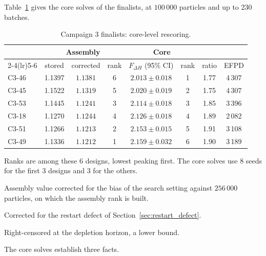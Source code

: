 \label{sec:res-corevalidation}

Table~\ref{tab:core-finalists} gives the core solves of the finalists,
at $100\,000$ particles and up to 230 batches.

\begin{table}[htbp]
  \centering
  \begin{threeparttable}
  \caption{Campaign 3 finalists: core-level rescoring.}
  \label{tab:core-finalists}
  \small
  \setlength{\tabcolsep}{4pt}
  \begin{tabular}{lccccccc}
    \toprule
    & \multicolumn{3}{c}{Assembly} & \multicolumn{2}{c}{Core} & & \\
    \cmidrule(lr){2-4}\cmidrule(lr){5-6}
    & stored & corrected\tnote{a} & rank & $F_{\Delta H}$ (95\% CI)
      & rank & ratio & EFPD\tnote{b} \\
    \midrule
    C3-46 & 1.1397 & $1.1381$ & 6 & $2.013\pm0.018$ & 1 & 1.77 & 4\,307\tnote{c} \\
    C3-45 & 1.1522 & $1.1319$ & 5 & $2.020\pm0.019$ & 2 & 1.75 & 4\,307\tnote{c} \\
    C3-53 & 1.1445 & $1.1241$ & 3 & $2.114\pm0.018$ & 3 & 1.85 & 3\,396 \\
    C3-18 & 1.1270 & $1.1244$ & 4 & $2.126\pm0.018$ & 4 & 1.89 & 2\,082 \\
    C3-51 & 1.1266 & $1.1213$ & 2 & $2.153\pm0.015$ & 5 & 1.91 & 3\,108 \\
    C3-49 & 1.1336 & $1.1212$ & 1 & $2.159\pm0.032$ & 6 & 1.90 & 3\,189 \\
    \bottomrule
  \end{tabular}
  \begin{tablenotes}[flushleft]\footnotesize
    \item Ranks are among these 6 designs, lowest peaking first. The
      core solves use 8 seeds for the first 3 designs and 3 for the others.
    \item[a] Assembly value corrected for the bias of the search
      setting against $256\,000$ particles, on which the assembly rank
      is built.
    \item[b] Corrected for the restart defect of
      Section~\ref{sec:restart_defect}.
    \item[c] Right-censored at the depletion horizon, a lower bound.
  \end{tablenotes}
  \end{threeparttable}
\end{table}

The core solves establish three facts.

